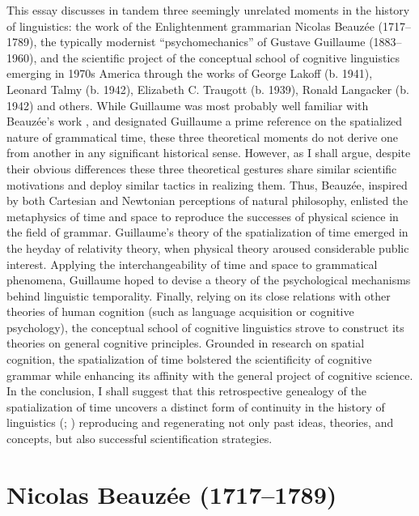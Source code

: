 \documentclass[output=paper]{langsci/langscibook}
\begin{document}
 This essay discusses in tandem three seemingly unrelated moments in the history of linguistics: the work of the Enlightenment grammarian Nicolas Beauzée (1717–1789), the typically modernist “psychomechanics” of Gustave Guillaume (1883–1960), and the scientific project of the conceptual school of cognitive linguistics emerging in 1970s America through the works of George Lakoff (b. 1941), Leonard Talmy (b. 1942), Elizabeth C. Traugott (b. 1939), Ronald Langacker (b. 1942) and others. While Guillaume was most probably well familiar with Beauzée’s work \citep{fournier_histoire_2013}, and \citet{traugott_spatial_1975} designated Guillaume a prime reference on the spatialized nature of grammatical time, these three theoretical moments do not derive one from another in any significant historical sense. However, as I shall argue, despite their obvious differences these three theoretical gestures share similar scientific motivations and deploy similar tactics in realizing them. Thus, Beauzée, inspired by both Cartesian and Newtonian perceptions of natural philosophy, enlisted the metaphysics of time and space to reproduce the successes of physical science in the field of grammar. Guillaume’s theory of the spatialization of time emerged in the heyday of relativity theory, when physical theory aroused considerable public interest. Applying the interchangeability of time and space to grammatical phenomena, Guillaume hoped to devise a theory of the psychological mechanisms behind linguistic temporality. Finally, relying on its close relations with other theories of human cognition (such as language acquisition or cognitive psychology), the conceptual school of cognitive linguistics strove to construct its theories on general cognitive principles. Grounded in research on spatial cognition, the spatialization of time bolstered the scientificity of cognitive grammar while enhancing its affinity with the general project of cognitive science. In the conclusion, I shall suggest that this retrospective genealogy of the spatialization of time uncovers a distinct form of continuity in the history of linguistics (\citealt{auroux_histoire_1980}; \citealt{colombat_histoire_2010}) reproducing and regenerating not only past ideas, theories, and concepts, but also successful scientification strategies.
 
 \section{Nicolas Beauzée (1717–1789)}
 
\end{document}
